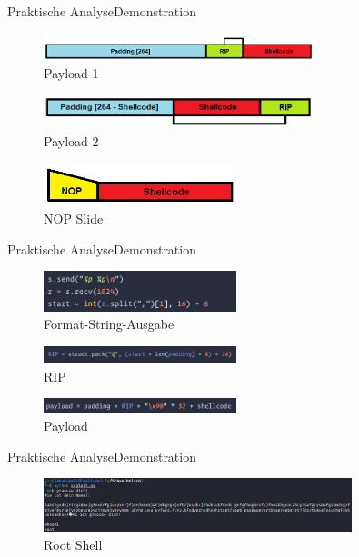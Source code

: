 \begin{frame}{Praktische Analyse}{Demonstration}
    \begin{figure}[h]
        \centering
        \includegraphics[width=0.7\textwidth,height=0.75\textheight,keepaspectratio]{images/payload1.png}
        \caption{Payload 1}
    \end{figure}
    \begin{figure}[h]
        \centering
        \includegraphics[width=0.7\textwidth,height=0.75\textheight,keepaspectratio]{images/payload2.png}
        \caption{Payload 2}
    \end{figure}
    \begin{figure}[h]
        \centering
        \includegraphics[width=0.5\textwidth,height=0.75\textheight,keepaspectratio]{images/nop.png}
        \caption{NOP Slide}
    \end{figure}
\end{frame}

\begin{frame}{Praktische Analyse}{Demonstration}
    \begin{figure}[h]
        \centering
        \includegraphics[width=0.5\textwidth,height=0.75\textheight,keepaspectratio]{images/format.png}
        \caption{Format-String-Ausgabe}
    \end{figure}
    \begin{figure}[h]
        \centering
        \includegraphics[width=0.5\textwidth,height=0.75\textheight,keepaspectratio]{images/rip.png}
        \caption{RIP}
    \end{figure}
    \begin{figure}[h]
        \centering
        \includegraphics[width=0.5\textwidth,height=0.75\textheight,keepaspectratio]{images/payload.png}
        \caption{Payload}
    \end{figure}
\end{frame}

\begin{frame}{Praktische Analyse}{Demonstration}
    \begin{figure}[h]
        \centering
        \includegraphics[width=0.8\textwidth,height=0.75\textheight,keepaspectratio]{images/root.png}
        \caption{Root Shell}
    \end{figure}
\end{frame}

